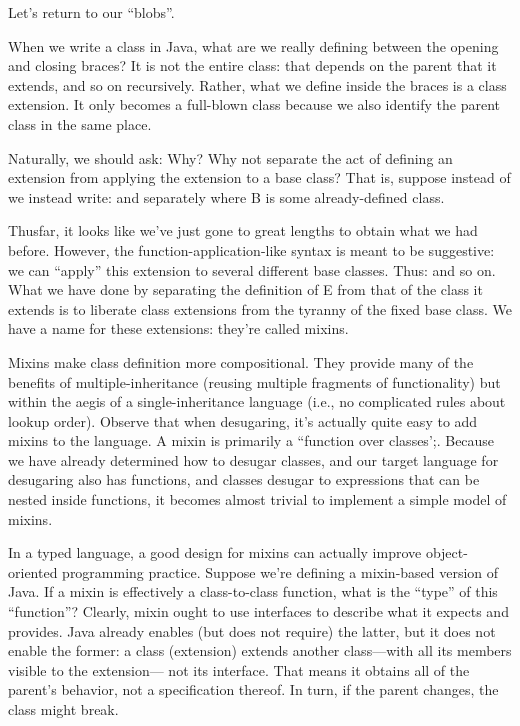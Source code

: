 
Let’s return to our “blobs”.

When we write a class in Java, what are we really defining between the opening
and closing braces? It is not the entire class: that depends on the parent that
it extends, and so on recursively. Rather, what we define inside the braces is a
class extension. It only becomes a full-blown class because we also identify the
parent class in the same place.

Naturally, we should ask: Why? Why not separate the act of defining an extension
from applying the extension to a base class? That is, suppose instead of
we instead write:
and separately
where B is some already-defined class.

Thusfar, it looks like we’ve just gone to great lengths to obtain what we had
before. However, the function-application-like syntax is meant to be suggestive:
we can “apply” this extension to several different base classes. Thus:
and so on. What we have done by separating the definition of E from that of the
class it extends is to liberate class extensions from the tyranny of the fixed
base class. We have a name for these extensions: they’re called mixins.

Mixins make class definition more compositional. They provide many of the
benefits of multiple-inheritance (reusing multiple fragments of functionality)
but within the aegis of a single-inheritance language (i.e., no complicated
rules about lookup order). Observe that when desugaring, it’s actually quite
easy to add mixins to the language. A mixin is primarily a “function over
classes’;. Because we have already determined how to desugar classes, and our
target language for desugaring also has functions, and classes desugar to
expressions that can be nested inside functions, it becomes almost trivial to
implement a simple model of mixins.

In a typed language, a good design for mixins can actually improve
object-oriented programming practice. Suppose we’re defining a mixin-based
version of Java. If a mixin is effectively a class-to-class function, what is
the “type” of this “function”? Clearly, mixin ought to use interfaces to
describe what it expects and provides. Java already enables (but does not
require) the latter, but it does not enable the former: a class (extension)
extends another class—with all its members visible to the extension— not its
interface. That means it obtains all of the parent’s behavior, not a
specification thereof. In turn, if the parent changes, the class might break.

